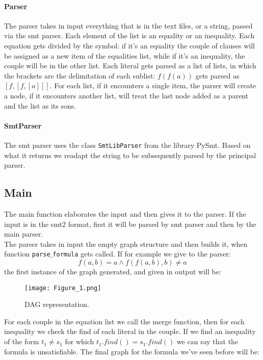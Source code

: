 \documentclass[11pt]{article}
\begin{document}
\paragraph{Parser}
    The parser takes in input everything that is in the text files, or a string, passed via the smt parser. Each element of the list is an equality or an inequality. Each equation gets divided by the symbol: if it's an equality the couple of clauses will be assigned as a new item of the equalities list, while if it's an inequality, the couple will be in the other list. Each literal gets parsed as a list of lists, in which the brackets are the delimitation of each sublist: $f(f(a))$ gets parsed as $[f, [f, [a]]]$. For each list, if it encounters a single item, the parser will create a node, if it encounters another list, will treat the last node added as a parent and the list as its sons.
\paragraph{SmtParser}
    The smt parser uses the class \texttt{SmtLibParser} from the library PySmt. Based on what it returns we readapt the string to be subsequently parsed by the principal parser.
\subsection{Main}
The main function elaborates the input and then gives it to the parser. If the input is in the smt2 format, first it will be parsed by smt parser and then by the main parser.\\
The parser takes in input the empty graph structure and then builds it, when function \texttt{parse$\_$formula} gets called. 
If for example we give to the parser:
$$f(a,b) = a \land f(f(a,b),b) \neq a$$
the first instance of the graph generated, and given in output will be:

\begin{figure}[!htbp]
    \centering
    \texttt{[image: Figure\_1.png]}
    \caption{DAG representation.}
    \label{fig:enter-label}
\end{figure}

For each couple in the equation list we call the merge function, then for each inequality we check the find of each literal in the couple. If we find an inequality of the form $t_1 \neq s_1$ for which $t_1.find() = s_1.find()$ we can say that the formula is unsatisfiable. The final graph for the formula we've seen before will be:
\end{document}
